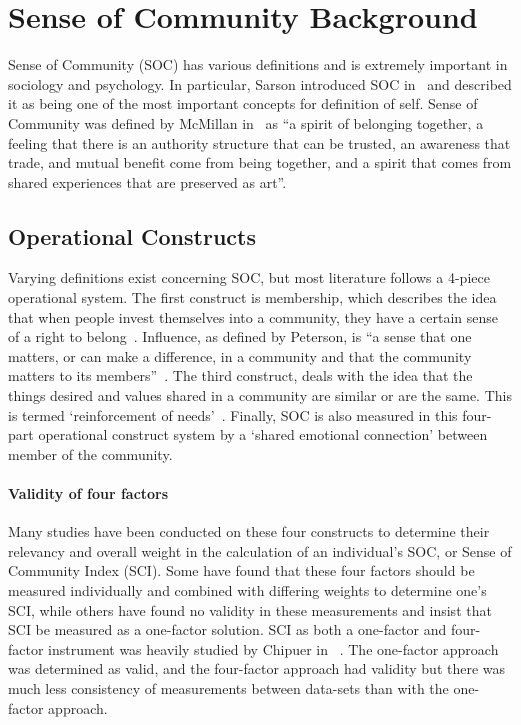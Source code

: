 \documentclass{sig-alternate}
\begin{document}
\section{Sense of Community Background}
\label{sec:background}
Sense of Community (SOC) has various definitions and is extremely important in sociology and psychology. In particular, Sarson introduced SOC in~\cite{sarson:1974} and described it as being one of the most important concepts for definition of self. Sense of Community was defined by McMillan in~\cite{senseOfCommunity:1996} as ``a spirit of belonging together, a feeling that there is an authority structure that can be trusted, an awareness that trade, and mutual benefit come from being together, and a spirit that comes from shared experiences that are preserved as art''. 
\subsection{Operational Constructs}
Varying definitions exist concerning SOC, but most literature follows a 4-piece operational system. The first construct is membership, which describes the idea that when people invest themselves into a community, they have a certain sense of a right to belong~\cite{definition:1986}. Influence, as defined by Peterson, is ``a sense that one matters, or can make a difference, in a
community and that the community matters to its members''~\cite{fourFactor:2008}. The third construct, deals with the idea that the things desired and values shared in a community are similar or are the same. This is termed `reinforcement of needs'~\cite{disparities:2009}. Finally, SOC is also measured in this four-part operational construct system by a `shared emotional connection' between member of the community. 
\paragraph{Validity of four factors}
Many studies have been conducted on these four constructs to determine their relevancy and overall weight in the calculation of an individual's SOC, or Sense of Community Index (SCI). Some have found that these four factors should be measured individually and combined with differing weights to determine one's SCI, while others have found no validity in these measurements and insist that SCI be measured as a one-factor solution. SCI as both a one-factor and four-factor instrument was heavily studied by Chipuer in ~\cite{oneFactor:1999}. The one-factor approach was determined as valid, and the four-factor approach had validity but there was much less consistency of measurements between data-sets than with the one-factor approach.
\end{document}
